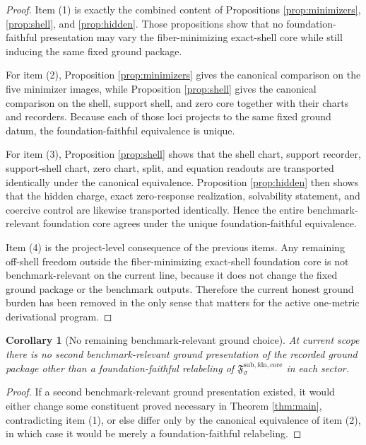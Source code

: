 \documentclass[11pt]{article}
\newcommand{\FoundationCore}{\mathfrak F^{\mathrm{sub,fdn,core}}}
\newtheorem{corollary}{Corollary}
\begin{document}
\begin{proof}
Item (1) is exactly the combined content of Propositions \ref{prop:minimizers}, \ref{prop:shell}, and \ref{prop:hidden}. Those propositions show that no foundation-faithful presentation may vary the fiber-minimizing exact-shell core while still inducing the same fixed ground package.

For item (2), Proposition \ref{prop:minimizers} gives the canonical comparison on the five minimizer images, while Proposition \ref{prop:shell} gives the canonical comparison on the shell, support shell, and zero core together with their charts and recorders. Because each of those loci projects to the same fixed ground datum, the foundation-faithful equivalence is unique.

For item (3), Proposition \ref{prop:shell} shows that the shell chart, support recorder, support-shell chart, zero chart, split, and equation readouts are transported identically under the canonical equivalence. Proposition \ref{prop:hidden} then shows that the hidden charge, exact zero-response realization, solvability statement, and coercive control are likewise transported identically. Hence the entire benchmark-relevant foundation core agrees under the unique foundation-faithful equivalence.

Item (4) is the project-level consequence of the previous items. Any remaining off-shell freedom outside the fiber-minimizing exact-shell foundation core is not benchmark-relevant on the current line, because it does not change the fixed ground package or the benchmark outputs. Therefore the current honest ground burden has been removed in the only sense that matters for the active one-metric derivational program.
\end{proof}

\begin{corollary}[No remaining benchmark-relevant ground choice]
\label{cor:nofreedom}
At current scope there is no second benchmark-relevant ground presentation of the recorded ground package other than a foundation-faithful relabeling of \(\FoundationCore_{\sigma}\) in each sector.
\end{corollary}

\begin{proof}
If a second benchmark-relevant ground presentation existed, it would either change some constituent proved necessary in Theorem \ref{thm:main}, contradicting item (1), or else differ only by the canonical equivalence of item (2), in which case it would be merely a foundation-faithful relabeling.
\end{proof}
\end{document}
